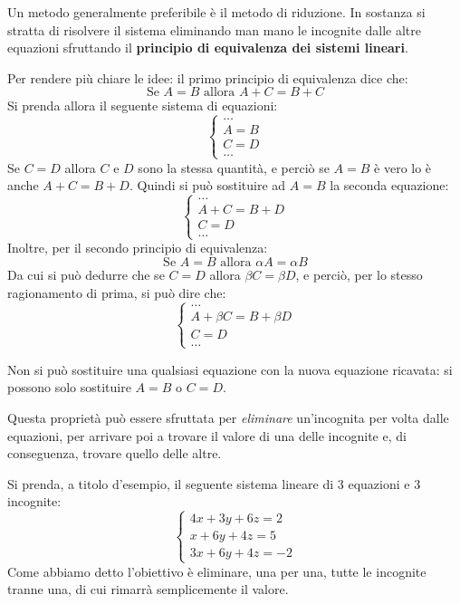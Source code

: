 Un metodo generalmente preferibile è il metodo di riduzione. In sostanza si stratta di risolvere il sistema eliminando man mano le incognite dalle altre equazioni sfruttando il \textbf{principio di equivalenza dei sistemi lineari}.

Per rendere più chiare le idee: il primo principio di equivalenza dice che:
\[
    \text{Se } A = B \text{ allora } A + C = B + C
\]
Si prenda allora il seguente sistema di equazioni:
\[
    \begin{cases}
        \dots \\
        A = B \\
        C = D \\
        \dots
    \end{cases}
\]
Se $C = D$ allora $C$ e $D$ sono la stessa quantità, e perciò se $A = B$ è vero lo è anche $A + C = B + D$. Quindi si può sostituire ad $A = B$ la seconda equazione:
\[
    \begin{cases}
        \dots \\
        A + C = B + D \\
        C = D \\
        \dots
    \end{cases}
\]
Inoltre, per il secondo principio di equivalenza:
\[
    \text{Se } A = B \text{ allora } \alpha A = \alpha B
\]
Da cui si può dedurre che se $C = D$ allora $\beta C = \beta D$, e perciò, per lo stesso ragionamento di prima, si può dire che:
\[
    \begin{cases}
        \dots \\
        A + \beta C = B + \beta D \\
        C = D \\
        \dots
    \end{cases}
\]
\begin{nb}
    Non si può sostituire una qualsiasi equazione con la nuova equazione ricavata: si possono solo sostituire $A = B$ o $C = D$.
\end{nb}

Questa proprietà può essere sfruttata per \textit{eliminare} un'incognita per volta dalle equazioni, per arrivare poi a trovare il valore di una delle incognite e, di conseguenza, trovare quello delle altre.

Si prenda, a titolo d'esempio, il seguente sistema lineare di 3 equazioni e 3 incognite:
\[
    \begin{cases}
        4x + 3y + 6z = 2 \\
        x + 6y + 4z = 5 \\
        3x + 6y + 4z = -2
    \end{cases}
\]
Come abbiamo detto l'obiettivo è eliminare, una per una, tutte le incognite tranne una, di cui rimarrà semplicemente il valore.

